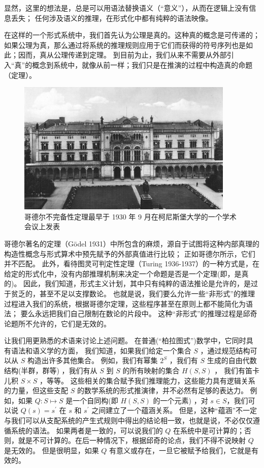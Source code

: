\documentclass[a4paper,12pt]{article}
\begin{document}
显然，这里的想法是，总是可以用语法替换语义（“意义”），从而在逻辑上没有信息丢失；
任何涉及语义的推理，在形式化中都有纯粹的语法映像。

在这样的一个形式系统中，我们首先认为公理是真的。这种真的概念是可传递的；
如果公理为真，那么通过将系统的推理规则应用于它们而获得的符号序列也是如此；因而，真从公理传递到定理。
到目前为止，我们从来不需要从外部引入“真”的概念到系统中，就像从前一样；我们只是在推演的过程中构造真的命题（定理）。

\begin{figure}[ht]
\centering
\includegraphics[height=2.5in]{images/konigsberger_university.jpg}
\caption{哥德尔不完备性定理最早于 1930 年 9 月在柯尼斯堡大学的一个学术会议上发表}
\end{figure}

哥德尔著名的定理（Gödel 1931）中所包含的麻烦，源自于试图将这种内部真理的构造性概念与形式算术中预先赋予的外部真值进行比较； 正如哥德尔所示，它们并不匹配。
此外，看待图灵可判定性定理（Turing 1936-1937）的一种方式是，在给定的形式化中，没有内部推理机制来决定一个命题是否是一个定理(即，是真的)。
因此，我们知道，形式主义计划，其中只有纯粹的语法推论是允许的，是过于贫乏的，甚至不足以支撑数论。
也就是说，我们要么允许一些“非形式”的推理过程进入我们的系统，根据哥德尔定理，这些程序甚至在原则上都不能简化为语法； 要么永远把我们自己限制在数论的片段中。
这种“非形式”的推理过程是邱奇论题所不允许的，它们是无效的。

让我们用更熟悉的术语来讨论上述问题。 在普通(“柏拉图式”)数学中，它同时具有语法和语义学的方面，
我们知道，如果我们给定一个集合 $S$ ，通过规范结构可以从 $S$ 构造出许多其他集合。
例如，我们有幂集 $2^S$ ，我们有 $S$ 生成的自由代数结构(半群，群等) ，我们有从 $S$ 到 $S$ 的所有映射的集合 $H(S, S)$ ，
我们有笛卡儿积 $S \times S$ ，等等。
这些相关的集合赋予我们推理能力，这些能力具有逻辑关系的力量，但这些支配 $S$ 的数学系统的形式推演律，并不必然有足够的表达力。
例如，如果 $Q: S \mapsto S$ 是一个自同构(即 $H(S, S)$ 的一个元素) ，对 $s \in S $，我们可以说 $Q(s) = s^{\prime}$ 在 $s$ 和 $s^{\prime}$ 之间建立了一个蕴涵关系。
但是，这种“蕴涵”不一定与我们可以从支配系统的产生式规则中得出的结论相一致，也就是说，不必仅仅遵循系统的语法。
如果两者是一致的，可以说我们的 $Q$ 在系统中是可计算的；否则，就是不可计算的。在后一种情况下，根据邱奇的论点，我们不得不说映射 $Q$ 是无效的。
但是很明显，如果 $Q$ 有意义或存在，一旦它被赋予给我们，它就是有效的。
\end{document}
